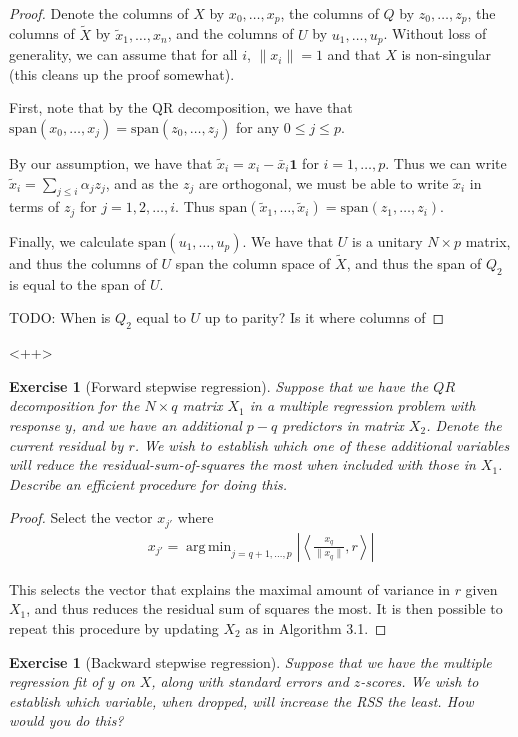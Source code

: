 \documentclass[12pt]{amsart}
\theoremstyle{plain}%
\newtheorem{exer}[thm]{Exercise}
\theoremstyle{definition}
\theoremstyle{remark}
\DeclareMathOperator*{\argmin}{arg\,min}
\begin{document}
\begin{proof}
    Denote the columns of $X$ by $x_0, \dots, x_{p}$, the columns of $Q$ by $z_0, \dots, z_p$, the columns of $\tilde X$ by $\tilde x_1, \dots, x_n$, and the columns of $U$ by $u_1, \dots, u_p$.  Without loss of generality, we can assume that for all $i$, $\| x_i \| = 1$ and that $X$ is non-singular (this cleans up the proof somewhat).


    First, note that by the QR decomposition, we have that $\text{span}(x_0, \dots, x_j) = \text{span}(z_0, \dots, z_j)$ for any $0 \leq j \leq p$.  

    By our assumption, we have that $\tilde x_i = x_i - \bar x_i \mathbf{1}$ for $i = 1, \dots, p$.  Thus we can write $\tilde x_i = \sum_{j \leq i} \alpha_j z_j$, and as the $z_j$ are orthogonal, we must be able to write $\tilde x_i$ in terms of $z_j$ for $j = 1, 2, \dots, i$.  Thus $\text{span}(\tilde x_1, \dots, \tilde x_i) = \text{span}(z_1, \dots, z_i)$.  

    Finally, we calculate $\text{span}(u_1, \dots, u_p)$.  We have that $U$ is a unitary $N \times p$ matrix, and thus the columns of $U$ span the column space of $\tilde X$, and thus the span of $Q_2$ is equal to the span of $U$.  

    TODO: When is $Q_2$ equal to $U$ up to parity?  Is it where columns of 
\end{proof}<++>
\begin{exer}[Forward stepwise regression]
    Suppose that we have the $QR$ decomposition for the $N \times q$ matrix $X_1$ in a multiple regression problem with response $y$, and we have an additional $p - q$ predictors in matrix $X_2$.  Denote the current residual by $r$.  We wish to establish which one of these additional variables will reduce the residual-sum-of-squares the most when included with those in $X_1$.  Describe an efficient procedure for doing this.
\end{exer}

\begin{proof}
    Select the vector $x_{j'}$ where
    \begin{align*}
        x_{j'} = \argmin_{j = q+1, \dots, p} \left| \left\langle \frac{x_q}{\| x_q \|}, r \right\rangle \right| 
    \end{align*}
    
    This selects the vector that explains the maximal amount of variance in $r$ given $X_1$, and thus reduces the residual sum of squares the most.  It is then possible to repeat this procedure by updating $X_2$ as in Algorithm 3.1.
\end{proof}
\begin{exer}[Backward stepwise regression]
    Suppose that we have the multiple regression fit of $y$ on $X$, along with standard errors and $z$-scores.  We wish to establish which variable, when dropped, will increase the RSS the least.  How would you do this?
\end{exer}
\end{document}
